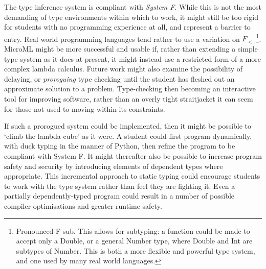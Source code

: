 \documentclass[12pt, a4paper]{report}
\begin{document}
The type inference system is compliant with \textit{System F}. While this is not the most demanding
of type environments within which to work, it might still be too rigid for students with no
programming experience at all, and represent a barrier to entry. Real world programming languages
tend rather to use a variation on $F_{<:}$\footnote{Pronounced F-sub. This allows for subtyping:
a function could be made to accept only a Double, or a general Number type, where Double and
Int are subtypes of Number. This is both a more flexible and powerful type system, and one used
by many real world languages.}. MicroML might be more successful and usable if, rather than
extending a simple type system as it does at present, it might instead use a restricted form of
a more complex lambda calculus. Future work might also examine the possibility of delaying, or
\textit{proroguing} type checking until the student has fleshed out an approximate solution to a
problem\cite{Afshari:2012:LPP:2384592.2384595}. Type-checking then becoming an interactive tool
for improving software, rather than an overly tight straitjacket it can seem for those not used to
moving within its constraints.

If such a prorogued system could be implemented, then it might be possible to `climb the lambda
cube' as it were. A student could first program dynamically, with duck typing in the manner of
Python, then refine the program to be compliant with System F. It might thereafter also be possible
to increase program safety and security by introducing elements of dependent types where
appropriate. This incremental approach to static typing could encourage students to work with the
type system rather than feel they are fighting it. Even a partially dependently-typed program could
result in a number of possible compiler optimisations and greater runtime safety.
\end{document}

